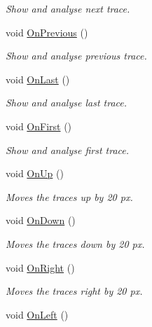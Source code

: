 \begin{DoxyCompactItemize}
\begin{DoxyCompactList}\small\item\em Show and analyse next trace. \item\end{DoxyCompactList}\item 
void \hyperlink{classwxStfGraph_a7936092de661032f6ceb0373a57b1876}{OnPrevious} ()
\begin{DoxyCompactList}\small\item\em Show and analyse previous trace. \item\end{DoxyCompactList}\item 
void \hyperlink{classwxStfGraph_aa353e7aa0aefef645123a32925e1ca7f}{OnLast} ()
\begin{DoxyCompactList}\small\item\em Show and analyse last trace. \item\end{DoxyCompactList}\item 
void \hyperlink{classwxStfGraph_a201bfc2f8af1928bbe2c2ac393bde623}{OnFirst} ()
\begin{DoxyCompactList}\small\item\em Show and analyse first trace. \item\end{DoxyCompactList}\item 
void \hyperlink{classwxStfGraph_aab8d2886c44369a581363a6c4dfa9a3d}{OnUp} ()
\begin{DoxyCompactList}\small\item\em Moves the traces up by 20 px. \item\end{DoxyCompactList}\item 
void \hyperlink{classwxStfGraph_acb8e9314a98a9b7fa830c85f79911673}{OnDown} ()
\begin{DoxyCompactList}\small\item\em Moves the traces down by 20 px. \item\end{DoxyCompactList}\item 
void \hyperlink{classwxStfGraph_a223c167a1f0ae50855209292172417e1}{OnRight} ()
\begin{DoxyCompactList}\small\item\em Moves the traces right by 20 px. \item\end{DoxyCompactList}\item 
void \hyperlink{classwxStfGraph_aef0d5d13d92a20863c33125a3c797b2f}{OnLeft} ()

\end{DoxyCompactItemize}
